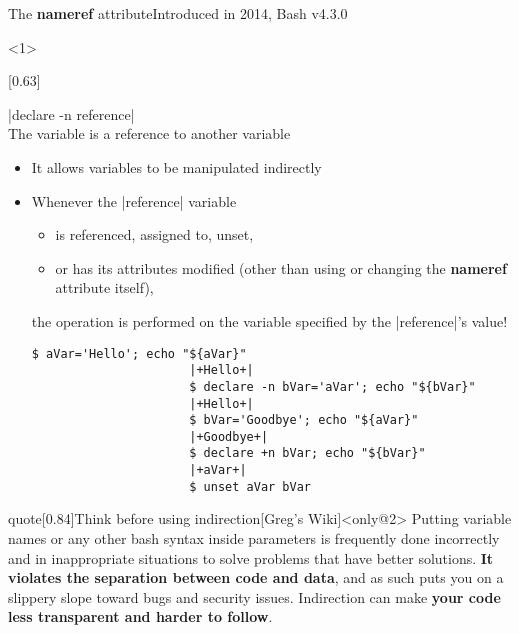 
\begin{frame}[fragile]{The \textbf{nameref} attribute}{Introduced in 2014, Bash v4.3.0}
    \vspace{-2mm}
    \begin{onlyenv}<1>
        \begin{varblock}{}[0.63\textwidth]{}
        \begin{description}
            \item[\textbf{Reference:}]
                \bash|declare -n reference|\\
                The variable is a reference to another variable
        \end{description}
        \end{varblock}
        \begin{itemize}
            \item It allows variables to be manipulated indirectly
            \item Whenever the \bash|reference| variable
                  \begin{itemize}
                      \item is referenced, assigned to, unset,
                      \item or has its attributes modified (other than using or changing the \textbf{nameref} attribute itself),
                  \end{itemize}
                  the operation is performed on the variable specified by the \bash|reference|'s value!
                  \begin{lstlisting}[style=MyBash, style=oddnumbers, xleftmargin=6mm, xrightmargin=15mm, aboveskip=3mm]
                      $ aVar='Hello'; echo "${aVar}"
                      |+Hello+|
                      $ declare -n bVar='aVar'; echo "${bVar}"
                      |+Hello+|
                      $ bVar='Goodbye'; echo "${aVar}"
                      |+Goodbye+|
                      $ declare +n bVar; echo "${bVar}"
                      |+aVar+|
                      $ unset aVar bVar
                  \end{lstlisting}
        \end{itemize}
    \end{onlyenv}
    \begin{varblock}{quote}[0.84\textwidth]{Think before using indirection}[Greg's Wiki]<only@2>
        Putting variable names or any other bash syntax inside parameters is frequently done incorrectly and in inappropriate situations to solve problems that have better solutions.
        \textbf{It violates the separation between code and data}, and as such puts you on a slippery slope toward bugs and security issues.
        Indirection can make \textbf{your code less transparent and harder to follow}.


\end{varblock}
\end{frame}
